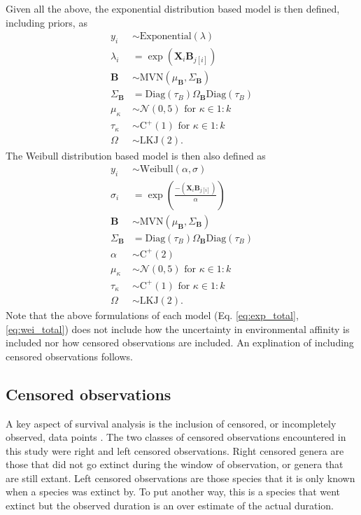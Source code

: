 \documentclass[12pt,letterpaper]{article}
\begin{document}
Given all the above, the exponential distribution based model is then defined, including priors, as 
\begin{equation}
  \begin{aligned}
    y_{i} &\sim \mathrm{Exponential}(\lambda) \\
    \lambda_{i} &= \exp(\mathbf{X}_{i} \mathbf{B}_{j[i]}) \\
    \mathbf{B} &\sim \mathrm{MVN}(\mu_{\mathbf{B}}, \Sigma_{\mathbf{B}}) \\
    \Sigma_{\mathbf{B}} &= \text{Diag}(\tau_{B}) \Omega_{\mathbf{B}} \text{Diag}(\tau_{B}) \\
    \mu_{\kappa} &\sim \mathcal{N}(0, 5) \text{ for } \kappa \in 1:k \\
    \tau_{\kappa} &\sim \mathrm{C^{+}}(1) \text{ for } \kappa \in 1:k \\
    \Omega &\sim \text{LKJ}(2).
  \end{aligned}
  \label{eq:exp_total}
\end{equation}
The Weibull distribution based model is then also defined as
\begin{equation}
  \begin{aligned}
    y_{i} &\sim \mathrm{Weibull}(\alpha, \sigma) \\
    \sigma_{i} &= \exp\left(\frac{-(\mathbf{X}_{i} \mathbf{B}_{j[i]})}{\alpha}\right) \\
    \mathbf{B} &\sim \mathrm{MVN}(\mu_{\mathbf{B}}, \Sigma_{\mathbf{B}}) \\
    \Sigma_{\mathbf{B}} &= \text{Diag}(\tau_{B}) \Omega_{\mathbf{B}} \text{Diag}(\tau_{B}) \\
    \alpha &\sim \mathrm{C^{+}}(2) \\
    \mu_{\kappa} &\sim \mathcal{N}(0, 5) \text{ for } \kappa \in 1:k \\
    \tau_{\kappa} &\sim \mathrm{C^{+}}(1) \text{ for } \kappa \in 1:k \\
    \Omega &\sim \text{LKJ}(2).
  \end{aligned}
  \label{eq:wei_total}
\end{equation}
Note that the above formulations of each model (Eq. \ref{eq:exp_total}, \ref{eq:wei_total}) does not include how the uncertainty in environmental affinity is included nor how censored observations are included. An explination of including censored observations follows.


\subsection{Censored observations}
A key aspect of survival analysis is the inclusion of censored, or incompletely observed, data points \citep{Ibrahim2001,Klein2003}. The two classes of censored observations encountered in this study were right and left censored observations. Right censored genera are those that did not go extinct during the window of observation, or genera that are still extant. Left censored observations are those species that it is only known when a species was extinct by. To put another way, this is a species that went extinct but the observed duration is an over estimate of the actual duration. 
\end{document}
